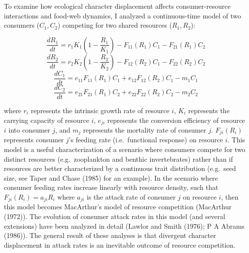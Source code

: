 \documentclass[11pt,]{article}
\begin{document}
To examine how ecological character displacement affects
consumer-resource interactions and food-web dynamics, I analyzed a
continuous-time model of two consumers (\(C_1,C_2\)) competing for two
shared resources (\(R_1,R_2\)):

\[\frac{dR_1}{dt}=r_1K_1(1-\frac{R_1}{K_1})-F_{11}(R_1)C_1-F_{21}(R_1)C_2\]
\[\frac{dR_2}{dt}=r_2K_2(1-\frac{R_2}{K_2})-F_{12}(R_2)C_1-F_{22}(R_2)C_2\]
\[\frac{dC_1}{dt}=e_{11}F_{11}(R_1)C_1+e_{12}F_{12}(R_2)C_1-m_1C_1\]
\[\frac{dC_2}{dt}=e_{21}F_{21}(R_1)C_2+e_{22}F_{22}(R_2)C_2-m_2C_2\]

where \(r_i\) represents the intrinsic growth rate of resource \(i\),
\(K_i\) represents the carrying capacity of resource \(i\), \(e_{ji}\)
represents the conversion efficiency of resource \(i\) into consumer
\(j\), and \(m_j\) represents the mortality rate of consumer \(j\).
\(F_{ji}(R_i)\) represents consumer \(j\)'s feeding rate
(i.e.~functional response) on resource \(i\). This model is a useful
characterization of a scenario where consumers compete for two distinct
resources (e.g.~zooplankton and benthic invertebrates) rather than if
resources are better characterized by a continuous trait distribution
(e.g.~seed size, see Taper and Chase (1985) for an example). In the
scenario where consumer feeding rates increase linearly with resource
density, such that \(F_{ji}(R_i)=a_{ji}R_i\) where \(a_{ji}\) is the
attack rate of consumer \(j\) on resource \(i\), then this model becomes
MacArthur's model of resource competition (MacArthur (1972)). The
evolution of consumer attack rates in this model (and several
extensions) have been analyzed in detail (Lawlor and Smith (1976); P A
Abrams (1986)). The general result of these analyses is that divergent
character displacement in attack rates is an inevitable outcome of
resource competition.
\end{document}

